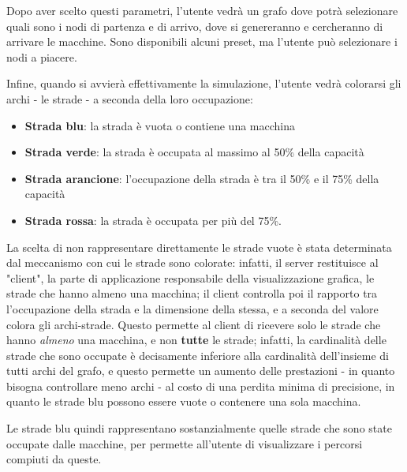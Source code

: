 \documentclass[main.tex]{subfiles}
\begin{document}


Dopo aver scelto questi parametri, l'utente vedrà un grafo dove potrà selezionare quali sono i nodi di partenza e di arrivo, dove si genereranno e cercheranno di arrivare le macchine. Sono disponibili alcuni preset, ma l'utente può selezionare i nodi a piacere. 

Infine, quando si avvierà effettivamente la simulazione, l'utente vedrà colorarsi gli archi - le strade - a seconda della loro occupazione:
\begin{itemize}
    \item \textbf{Strada blu}: la strada è vuota o contiene una macchina
    \item \textbf{Strada verde}: la strada è occupata al massimo al 50\% della capacità
    \item \textbf{Strada arancione}: l'occupazione della strada è tra il 50\% e il 75\% della capacità 
    \item \textbf{Strada rossa}: la strada è occupata per più del 75\%.
\end{itemize}

La scelta di non rappresentare direttamente le strade vuote è stata determinata dal meccanismo con cui le strade sono colorate: infatti, il server restituisce al "client", la parte di applicazione responsabile della visualizzazione grafica, le strade che hanno almeno una macchina; il client controlla poi il rapporto tra l'occupazione della strada e la dimensione della stessa, e a seconda del valore colora gli archi-strade. Questo permette al client di ricevere solo le strade che hanno \textit{almeno} una macchina, e non \textbf{tutte} le strade; infatti, la cardinalità delle strade che sono occupate è decisamente inferiore alla cardinalità dell'insieme di tutti archi del grafo, e questo permette un aumento delle prestazioni - in quanto bisogna controllare meno archi - al costo di una perdita minima di precisione, in quanto le strade blu possono essere vuote o contenere una sola macchina. 

Le strade blu quindi rappresentano sostanzialmente quelle strade che sono state occupate dalle macchine, per permette all'utente di visualizzare i percorsi compiuti da queste. 
\end{document}
